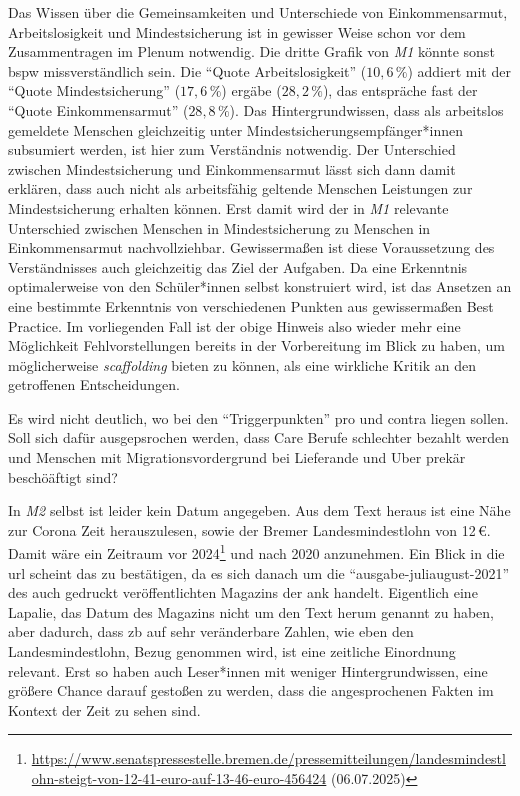 Das Wissen über die Gemeinsamkeiten und Unterschiede von Einkommensarmut, Arbeitslosigkeit und Mindestsicherung ist in gewisser Weise schon vor dem Zusammentragen im Plenum notwendig. 
Die dritte Grafik von \emph{M1} könnte sonst \gls{bspw} missverständlich sein. Die \enquote{Quote Arbeitslosigkeit} ($10,6\,\%$) addiert mit der \enquote{Quote Mindestsicherung} ($17,6\,\%$) ergäbe ($28,2\,\%$), das entspräche fast der \enquote{Quote Einkommensarmut} ($28,8\,\%$). Das Hintergrundwissen, dass als arbeitslos gemeldete Menschen gleichzeitig unter Mindestsicherungsempfänger*innen subsumiert werden, ist hier zum Verständnis notwendig. Der Unterschied zwischen Mindestsicherung und Einkommensarmut lässt sich dann damit erklären, dass auch nicht als arbeitsfähig geltende Menschen Leistungen zur Mindestsicherung erhalten können. Erst damit wird der in \emph{M1} relevante Unterschied zwischen Menschen in Mindestsicherung zu Menschen in Einkommensarmut nachvollziehbar. Gewissermaßen ist diese Voraussetzung des Verständnisses auch gleichzeitig das Ziel der Aufgaben. Da eine Erkenntnis optimalerweise von den Schüler*innen selbst konstruiert wird, ist das Ansetzen an eine bestimmte Erkenntnis von verschiedenen Punkten aus gewissermaßen Best Practice. Im vorliegenden Fall ist der obige Hinweis also wieder mehr eine Möglichkeit Fehlvorstellungen bereits in der Vorbereitung im Blick zu haben, um möglicherweise \emph{scaffolding} bieten zu können, als eine wirkliche Kritik an den getroffenen Entscheidungen. 

Es wird nicht deutlich, wo bei den \enquote{Triggerpunkten} pro und contra liegen sollen. Soll sich dafür ausgepsrochen werden, dass Care Berufe schlechter bezahlt werden und Menschen mit Migrationsvordergrund bei Lieferande und Uber prekär beschöäftigt sind? 

In \emph{M2} selbst ist leider kein Datum angegeben. Aus dem Text heraus ist eine Nähe zur Corona Zeit herauszulesen, sowie der Bremer Landesmindestlohn von 12\,€. Damit wäre ein Zeitraum vor 2024\footnote{
    \url{https://www.senatspressestelle.bremen.de/pressemitteilungen/landesmindestlohn-steigt-von-12-41-euro-auf-13-46-euro-456424} (06.07.2025)
} und nach 2020 anzunehmen. Ein Blick in die \gls{url} scheint das zu bestätigen, da es sich danach um die \enquote{ausgabe-juliaugust-2021} des auch gedruckt veröffentlichten Magazins der \gls{ank} handelt. Eigentlich eine Lapalie, das Datum des Magazins nicht um den Text herum genannt zu haben, aber dadurch, dass \gls{zb} auf sehr veränderbare Zahlen, wie eben den Landesmindestlohn, Bezug genommen wird, ist eine zeitliche Einordnung relevant. Erst so haben auch Leser*innen mit weniger Hintergrundwissen, eine größere Chance darauf gestoßen zu werden, dass die angesprochenen Fakten im Kontext der Zeit zu sehen sind. 


